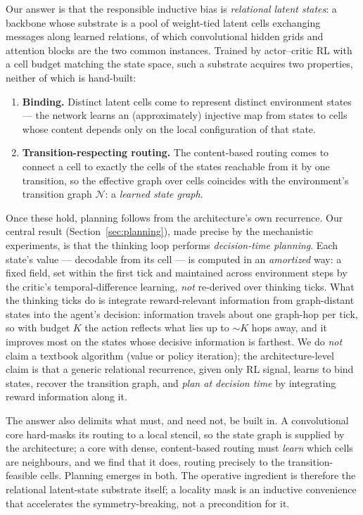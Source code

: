 \documentclass{article} %
\theoremstyle{plain}
\theoremstyle{definition}
\begin{document}
Our answer is that the responsible inductive bias is \emph{relational latent
states}: a backbone whose substrate is a pool of weight-tied latent cells
exchanging messages along learned relations, of which convolutional hidden
grids and attention blocks are the two common instances. Trained by
actor--critic RL with a cell budget matching the state space, such a substrate
acquires two properties, neither of which is hand-built:
\begin{enumerate}[leftmargin=1.5em,itemsep=2pt,topsep=2pt]
\item \textbf{Binding.} Distinct latent cells come to represent distinct
environment states --- the network learns an (approximately) injective map from
states to cells whose content depends only on the local configuration of that
state.
\item \textbf{Transition-respecting routing.} The content-based routing comes
to connect a cell to exactly the cells of the states reachable from it by one
transition, so the effective graph over cells coincides with the environment's
transition graph $\mathcal N$: a \emph{learned state graph}.
\end{enumerate}

Once these hold, planning follows from the architecture's own recurrence. Our
central result (Section~\ref{sec:planning}), made precise by the mechanistic
experiments, is that the thinking loop performs \emph{decision-time planning}.
Each state's value --- decodable from its cell --- is computed in an
\emph{amortized} way: a fixed field, set within the first tick and maintained
across environment steps by the critic's temporal-difference learning, \emph{not}
re-derived over thinking ticks. What the thinking ticks do is integrate
reward-relevant information from graph-distant states into the agent's decision:
information travels about one graph-hop per tick, so with budget $K$ the action
reflects what lies up to ${\sim}K$ hops away, and it improves most on the states
whose decisive information is farthest. We do \emph{not} claim a textbook algorithm
(value or policy iteration); the architecture-level claim is that a generic
relational recurrence, given only RL signal, learns to bind states, recover the
transition graph, and \emph{plan at decision time} by integrating reward
information along it.

The answer also delimits what must, and need not, be built in. A convolutional
core hard-masks its routing to a local stencil, so the state graph is supplied
by the architecture; a core with dense, content-based routing must
\emph{learn} which cells are neighbours, and we find that it does, routing
precisely to the transition-feasible cells. Planning emerges in both. The
operative ingredient is therefore the relational latent-state substrate
itself; a locality mask is an inductive convenience that accelerates the
symmetry-breaking, not a precondition for it.
\end{document}

